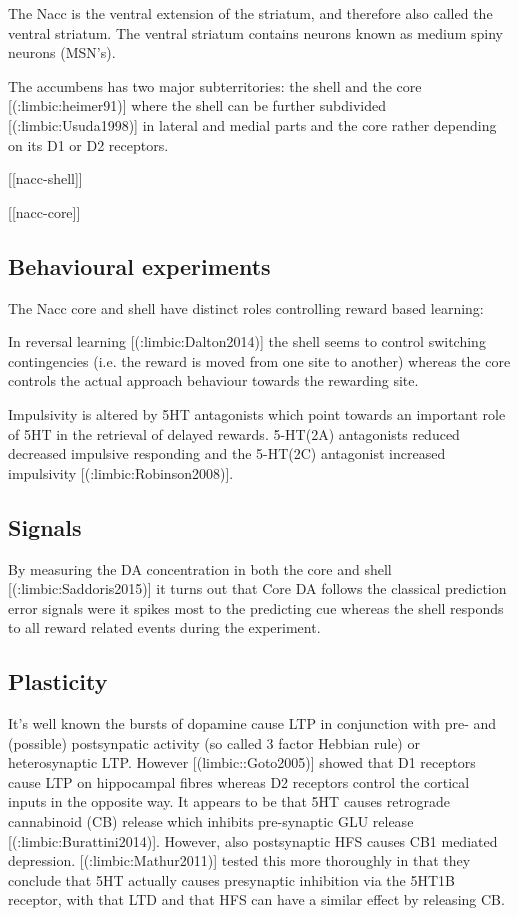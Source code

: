 {{The Nacc is the ventral extension of the striatum, and therefore also called the ventral striatum.  The ventral striatum contains neurons known as medium spiny neurons (MSN's).

The accumbens has two major subterritories: the shell and the core 
[(:limbic:heimer91)] where the shell can be further subdivided [(:limbic:Usuda1998)] in lateral and medial parts and the core rather depending on its D1 or D2 receptors.

[[nacc-shell]]

[[nacc-core]]

\subsection{Behavioural experiments}

The Nacc core and shell have distinct roles controlling reward based learning:

In reversal learning [(:limbic:Dalton2014)] the shell seems to control switching contingencies (i.e. the reward is moved from one site to another) whereas the core controls the actual approach behaviour towards the rewarding site.

Impulsivity is altered by 5HT antagonists which point towards an important role of 5HT in the retrieval of delayed rewards. 5-HT(2A) antagonists reduced decreased impulsive responding and the 5-HT(2C) antagonist increased impulsivity [(:limbic:Robinson2008)].

\subsection{Signals}

By measuring the DA concentration in both the core and shell [(:limbic:Saddoris2015)] it turns out that Core DA follows the classical prediction error signals were it spikes most to the predicting cue whereas the shell responds to all reward related events during the experiment.

\subsection{Plasticity}

It's well known the bursts of dopamine cause LTP in conjunction with pre- and (possible) postsynpatic activity (so called 3 factor Hebbian rule) or heterosynaptic LTP. However [(limbic::Goto2005)] showed that D1 receptors cause LTP on hippocampal fibres whereas D2 receptors control the cortical inputs in the opposite way.
It appears to be that 5HT causes retrograde cannabinoid (CB) release which inhibits pre-synaptic GLU release [(:limbic:Burattini2014)]. However, also postsynaptic HFS causes CB1 mediated depression. [(:limbic:Mathur2011)] tested this more thoroughly in that they conclude that 5HT actually causes presynaptic inhibition via the 5HT1B receptor, with that LTD and that HFS can have a similar effect by releasing CB.



}}
